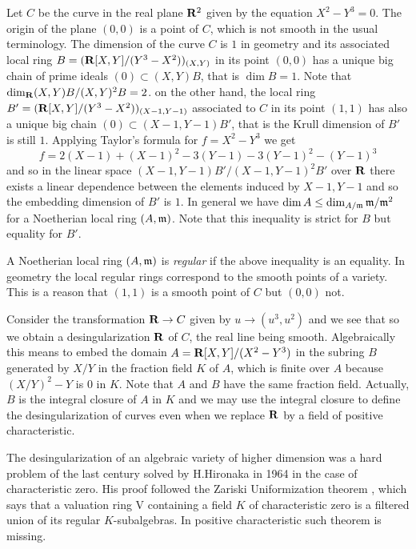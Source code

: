 \documentclass[12pt]{amsart}
\def\frk{\frak}               %
\def\mm{{\frk m}}
\let\to=\rightarrow
\theoremstyle{definition}
\theoremstyle{subsection-tweak}
\theoremstyle{theorem}
\theoremstyle{definition}
\begin{document}
Let $C$ be the curve in the real plane
  ${\bf R}^2$ given by the equation   $X^2-Y^3=0$. The origin of the plane  $(0,0)$ is a point of  $C$, which is not smooth  in the usual terminology.  The dimension of the curve $C$ is $1$ in geometry  and its associated local ring  $B=({\bf R}[X,Y]/(Y^3-X^2))_{(X,Y)}$ in its point $(0,0)$ has a unique  big chain of prime ideals   $(0)\subset (X,Y)B$, that is $\dim B=1$. Note that 
  $\dim_{\bf R} (X,Y)B/(X,Y)^2B=2$.
on the other hand, the local ring   
   $B'=({\bf R}[X,Y]/(Y^3-X^2))_{(X-1,Y-1)}$ associated to  $C$ in its point $(1,1)$ has also a unique  big chain $(0)\subset (X-1,Y-1)B'$, that is the Krull dimension of   $B'$ is still $1$. Applying  Taylor's formula  for  $f=X^2-Y^3$ we get 
$$f=2(X-1)+(X-1)^2-3(Y-1) -3(Y-1)^2-(Y-1)^3$$ and so in the linear space 
  $( X-1,Y-1)B'/( X-1,Y-1)^2B'$ over  $\bf R$ there exists a linear dependence 
 between the elements induced by  
    $X-1,Y-1$ and so  the embedding dimension of  $B'$ is $1$.
 In general we have 
 $\dim A\leq \dim_{A/\mm} \mm/\mm^2 $ for a Noetherian local ring $(A,\mm)$. 
Note that this inequality is strict for $B$ but equality for $B'$. 


 A Noetherian local ring $(A,\mm)$ is {\em regular} if the above inequality is an equality.
In geometry the local regular rings correspond to the smooth points of a variety. This is a reason that  $(1,1)$ is a smooth point of $C$ but $(0,0)$ not.
  
  
Consider the transformation 
   ${\bf R}\to C$ given by  $u\to (u^3,u^2)$ and we see that so we obtain a desingularization $\bf R$ of $C$, the real line being smooth.
  Algebraically this means to embed the domain  
    $A={\bf R}[X,Y]/(X^2-Y^3)$ in the subring $B$ generated by   $X/Y$ in the fraction field    $K$ of  $A$, which is finite over $A$ because     $(X/Y)^2-Y$ is $0$ in $K$. Note that $A$ and $B$ have the same fraction field. Actually, $B$ is the integral closure of $A$ in $K$ and we may use the integral closure to define the desingularization of curves even when we replace $\bf R$  
 by a field of positive characteristic.
 
    The desingularization of an algebraic variety of higher dimension was a hard problem of the last century solved by H.Hironaka in 1964 in the case of characteristic zero. His proof followed the 
Zariski Uniformization theorem \cite{Z}, which says that 
     a valuation ring V containing a field $K$ of characteristic zero is a filtered union of its regular  $K$-subalgebras. In positive characteristic such theorem is missing.
     
\end{document}
